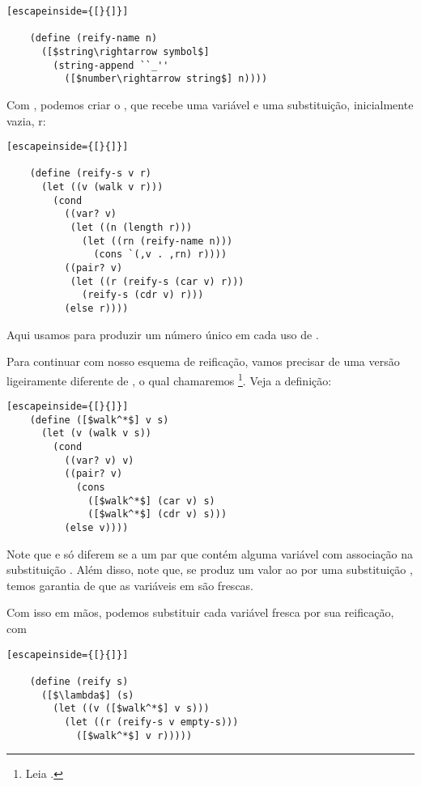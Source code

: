\documentclass{article}
\begin{document}
  \begin{lstlisting}[escapeinside={[}{]}]

    (define (reify-name n)
      ([$string\rightarrow symbol$]
        (string-append ``_''
          ([$number\rightarrow string$] n))))

  \end{lstlisting}

  Com , podemos criar o , que
  recebe uma variável e uma substituição, inicialmente vazia, r:

  \begin{lstlisting}[escapeinside={[}{]}]

    (define (reify-s v r)
      (let ((v (walk v r)))
        (cond
          ((var? v)
           (let ((n (length r)))
             (let ((rn (reify-name n)))
               (cons `(,v . ,rn) r))))
          ((pair? v)
           (let ((r (reify-s (car v) r)))
             (reify-s (cdr v) r)))
          (else r))))

  \end{lstlisting}

  \noindent Aqui usamos  para produzir um número
  único em cada uso de .

  Para continuar com nosso esquema de reificação, vamos precisar de
  uma versão ligeiramente diferente de , o qual
  chamaremos \footnote{Leia .}. Veja a definição:
  
  \begin{lstlisting}[escapeinside={[}{]}]
    (define ([$walk^*$] v s)
      (let (v (walk v s))
        (cond
          ((var? v) v)
          ((pair? v)
            (cons
              ([$walk^*$] (car v) s)
              ([$walk^*$] (cdr v) s)))
          (else v))))
  \end{lstlisting}

  Note que  e  só diferem se
    a um par que contém alguma
  variável com associação na substituição . Além disso,
  note que, se  produz um valor  ao
   por uma substituição , temos
  garantia de que as variáveis em  são frescas.

  Com isso em mãos, podemos substituir cada variável fresca por sua
  reificação, com

  \begin{lstlisting}[escapeinside={[}{]}]

    (define (reify s)
      ([$\lambda$] (s)
        (let ((v ([$walk^*$] v s)))
          (let ((r (reify-s v empty-s)))
            ([$walk^*$] v r)))))

  \end{lstlisting}
\end{document}
